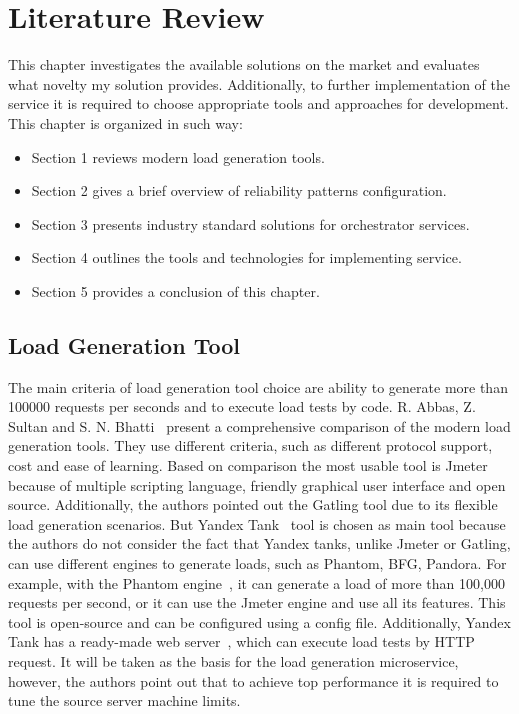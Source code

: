 \chapter{Literature Review}
\label{ch:lr}

This chapter investigates the available solutions on the market and evaluates what novelty my solution provides.
Additionally, to further implementation of the service it is required to choose appropriate tools and approaches for development.
This chapter is organized in such way:

\begin{itemize}
    \item Section 1 reviews modern load generation tools.
    \item Section 2 gives a brief overview of reliability patterns configuration.
    \item Section 3 presents industry standard solutions for orchestrator services.
    \item Section 4 outlines the tools and technologies for implementing service.
    \item Section 5 provides a conclusion of this chapter.
\end{itemize}

\section{Load Generation Tool}\label{sec:load_generation}
The main criteria of load generation tool choice are ability to generate more than 100000 requests per seconds and to execute load tests by code.
R. Abbas, Z. Sultan and S. N. Bhatti~\cite{load_testing_tools} present a comprehensive comparison of the modern load generation tools.
They use different criteria, such as different protocol support, cost and ease of learning.
Based on comparison the most usable tool is Jmeter because of multiple scripting language, friendly graphical user interface and open source.
Additionally, the authors pointed out the Gatling tool due to its flexible load generation scenarios.
But Yandex Tank~\cite{yandex_tank} tool is chosen as main tool because the authors do not consider the fact that Yandex tanks, unlike Jmeter or Gatling, can use different engines to generate loads, such as Phantom, BFG, Pandora.
For example, with the Phantom engine~\cite{phantom}, it can generate a load of more than 100,000 requests per second, or it can use the Jmeter engine and use all its features.
This tool is open-source and can be configured using a config file.
Additionally, Yandex Tank has a ready-made web server~\cite{yandex_tank_api}, which can execute load tests by HTTP request.
It will be taken as the basis for the load generation microservice, however, the authors point out that to achieve top performance it is required to tune the source server machine limits.


